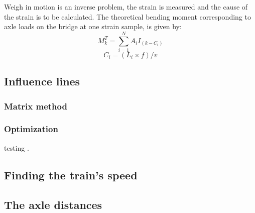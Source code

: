 Weigh in motion is an inverse problem, the strain is measured and the cause of the strain is to be calculated. The theoretical bending moment corresponding to axle loads on the bridge at one strain sample, is given by:
\begin{equation}
M_k^T = \sum_{i = 1}^{N} A_i I_{(k-C_i)}
\end{equation}
\begin{equation}
C_i = (L_i \times f)/v
\end{equation}
\subsection{Influence lines}

\subsubsection{Matrix method}

\subsubsection{Optimization}
testing \cite{Liljencrantz}.

\subsection{Finding the train's speed}

\subsection{The axle distances}
